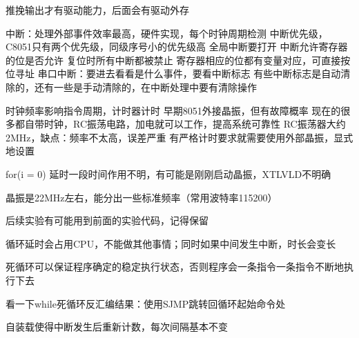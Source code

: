 推挽输出才有驱动能力，后面会有驱动外存

中断：处理外部事件效率最高，硬件实现，每个时钟周期检测
中断优先级，C8051只有两个优先级，同级序号小的优先级高
全局中断要打开
中断允许寄存器的位是否允许
复位时所有中断都被禁止
寄存器相应的位都有变量对应，可直接按位寻址
串口中断：要进去看看是什么事件，要看中断标志
有些中断标志是自动清除的，还有一些是手动清除的，在中断处理中要有清除操作

时钟频率影响指令周期，计时器计时
早期8051外接晶振，但有故障概率
现在的很多都自带时钟，RC振荡电路，加电就可以工作，提高系统可靠性
RC振荡器大约2MHz，缺点：频率不太高，误差严重
有严格计时要求就需要使用外部晶振，显式地设置

for(i = 0) 延时一段时间作用不明，有可能是刚刚启动晶振，XTLVLD不明确

晶振是22MHz左右，能分出一些标准频率（常用波特率115200）

后续实验有可能用到前面的实验代码，记得保留

循环延时会占用CPU，不能做其他事情；同时如果中间发生中断，时长会变长

死循环可以保证程序确定的稳定执行状态，否则程序会一条指令一条指令不断地执行下去

看一下while死循环反汇编结果：使用SJMP跳转回循环起始命令处

自装载使得中断发生后重新计数，每次间隔基本不变
